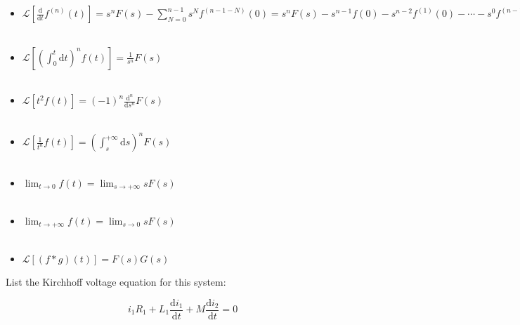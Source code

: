 \documentclass[a4paper,11pt]{amsart}
\theoremstyle{definition}
\begin{document}
	\begin{itemize}
		
		\item $\displaystyle \mathscr{L} \left[ \frac{\mathrm{d}}{\mathrm{d}t}f^{\left( n \right)}\left( t \right) \right] =s^nF\left( s \right) -\sum_{N=0}^{n-1}{s^Nf^{\left( n-1-N \right)}\left( 0 \right)}=s^nF\left( s \right) -s^{n-1}f\left( 0 \right) -s^{n-2}f^{\left( 1 \right)}\left( 0 \right) -\cdots -s^0f^{\left( n-1 \right)}\left( 0 \right)  $\\\\
		
		\item $\displaystyle \mathscr{L} \left[ \left( \int_0^t{\mathrm{d}t} \right) ^nf\left( t \right) \right] =\frac{1}{s^n}F\left( s \right) $\\\\
	
		
		\item $\displaystyle \mathscr{L} \left[ t^2f\left( t \right) \right] =\left( -1 \right) ^n\frac{\mathrm{d}^n}{\mathrm{d}s^n}F\left( s \right) $\\\\
		
		\item $\displaystyle \mathscr{L} \left[ \frac{1}{t^n}f\left( t \right) \right] =\left( \int_s^{+\infty}{\mathrm{d}s} \right) ^nF\left( s \right) $\\\\
		
		\item $\displaystyle \lim_{t\longrightarrow 0} f\left( t \right) =\lim_{s\longrightarrow +\infty} sF\left( s \right) $\\\\
		
		\item $\displaystyle \lim_{t\longrightarrow +\infty} f\left( t \right) =\lim_{s\longrightarrow 0} sF\left( s \right) $\\\\
		
		\item $\displaystyle \mathscr{L} \left[ \left( f\ast g \right) \left( t \right) \right] =F\left( s \right) G\left( s \right) $
		
	\end{itemize}
	
	List the Kirchhoff voltage equation for this system:
	
	$$
	i_1R_1+L_1\frac{\mathrm{d}i_1}{\mathrm{d}t}+M\frac{\mathrm{d}i_2}{\mathrm{d}t}=0
	$$
	
\end{document}
